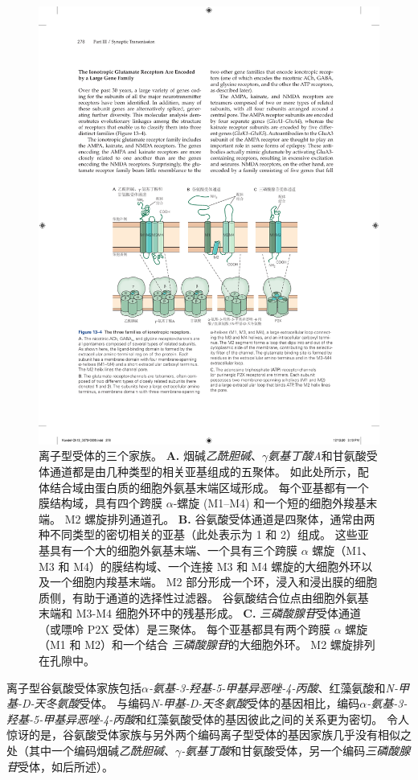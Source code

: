 \begin{figure}[htbp]
	\centering
	\includegraphics[width=0.85\linewidth]{chap13/fig_13_4}
	\caption{离子型受体的三个家族。
		\textbf{A.} 烟碱\textit{乙酰胆碱}、\textit{$\gamma$氨基丁酸A}和甘氨酸受体通道都是由几种类型的相关亚基组成的五聚体。
		如此处所示，配体结合域由蛋白质的细胞外氨基末端区域形成。
		每个亚基都有一个膜结构域，具有四个跨膜 $\alpha$-螺旋 (M1–M4) 和一个短的细胞外羧基末端。
		M2 螺旋排列通道孔。
		\textbf{B.} 谷氨酸受体通道是四聚体，通常由两种不同类型的密切相关的亚基（此处表示为 1 和 2）组成。
		这些亚基具有一个大的细胞外氨基末端、一个具有三个跨膜 $\alpha$ 螺旋（M1、M3 和 M4）的膜结构域、一个连接 M3 和 M4 螺旋的大细胞外环以及一个细胞内羧基末端。
		M2 部分形成一个环，浸入和浸出膜的细胞质侧，有助于通道的选择性过滤器。
		谷氨酸结合位点由细胞外氨基末端和 M3-M4 细胞外环中的残基形成。
		\textbf{C.} \textit{三磷酸腺苷}受体通道（或嘌呤 P2X 受体）是三聚体。
		每个亚基都具有两个跨膜 $\alpha$ 螺旋（M1 和 M2）和一个结合 \textit{三磷酸腺苷}的大细胞外环。
		M2 螺旋排列在孔隙中。}
	\label{fig:13_4}
\end{figure}


离子型谷氨酸受体家族包括\textit{$\alpha$-氨基-3-羟基-5-甲基异恶唑-4-丙酸}、红藻氨酸和\textit{N-甲基-D-天冬氨酸}受体。
与编码\textit{N-甲基-D-天冬氨酸}受体的基因相比，编码\textit{$\alpha$-氨基-3-羟基-5-甲基异恶唑-4-丙酸}和红藻氨酸受体的基因彼此之间的关系更为密切。
令人惊讶的是，谷氨酸受体家族与另外两个编码离子型受体的基因家族几乎没有相似之处（其中一个编码烟碱\textit{乙酰胆碱}、\textit{$\gamma$-氨基丁酸}和甘氨酸受体，另一个编码\textit{三磷酸腺苷}受体，如后所述）。


